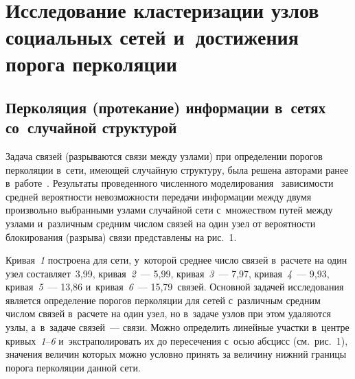 \begin{multicols}{2}
\begin{figure*} %
\vspace*{1pt}
 \begin{center}
 \mbox{%
 \epsfxsize=106.462mm 
 }
 \end{center}
\vspace*{-9pt}
\end{figure*}

\vspace*{-6pt}

\section{Исследование кластеризации узлов социальных сетей 
и~достижения порога перколяции}

\subsection{Перколяция (протекание) информации в~сетях со~случайной 
структурой}

  Задача связей (разрываются связи между узлами) при определении порогов 
перколяции в~сети, име\-ющей случайную структуру, была решена авторами 
ранее в~работе~\cite{14-zh}. Результаты проведенного чис\-лен\-но\-го 
моделирования~\cite{13-zh, 14-zh} за\-ви\-си\-мости средней ве\-ро\-ят\-ности 
не\-воз\-мож\-ности передачи информации между двумя произвольно выбранными 
узлами случайной сети с~множеством путей между узлами и~различным 
сред\-ним чис\-лом связей на один узел от ве\-ро\-ят\-ности блокирования (разрыва) 
связи пред\-став\-ле\-ны на рис.~1. 
  
  


Кривая~\textit{1} построена для сети, у~которой среднее чис\-ло связей 
в~расчете на один узел со\-став\-ля\-ет~3,99, кривая~\textit{2}~--- 5,99, 
кривая~\textit{3}~--- 7,97, кривая~\textit{4}~--- 9,93, кривая~\textit{5}~--- 13,86 
и~кривая~\textit{6}~--- 15,79~связей. Основной задачей исследования является 
определение порогов перколяции для сетей с~различным средним чис\-лом 
связей в~расчете на один узел, но в~задаче узлов при этом удаляются узлы, 
а~в~задаче связей~--- связи. Можно определить линейные участки в~цент\-ре 
кривых~\textit{1}--\textit{6} и~экстраполировать их до 
пересечения с~осью абсцисс (см.\ рис.~1), значения величин которых можно 
условно принять за величину нижний границы порога перколяции данной сети. 
  

\end{multicols}
